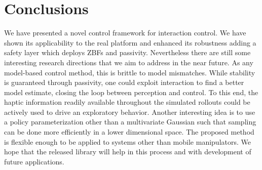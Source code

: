 \section{Conclusions} \label{sec:conclusions}

We have presented a novel control framework for interaction control. We have shown its applicability to the real platform and enhanced its robustness adding a safety layer which deploys ZBFs and passivity. Nevertheless there are still some interesting research directions that we aim to address in the near future. As any model-based control method, this is brittle to model mismatches. While stability is guaranteed through passivity, one could exploit interaction to find a better model estimate, closing the loop between perception and control. To this end, the haptic information readily available throughout the simulated rollouts could be actively used to drive an exploratory behavior. Another interesting idea is to use a policy parameterization other than a multivariate Gaussian such that sampling can be done more efficiently in a lower dimensional space. The proposed method is flexible enough to be applied to systems other than mobile manipulators. We hope that the released library will help in this process and with development of future applications. 